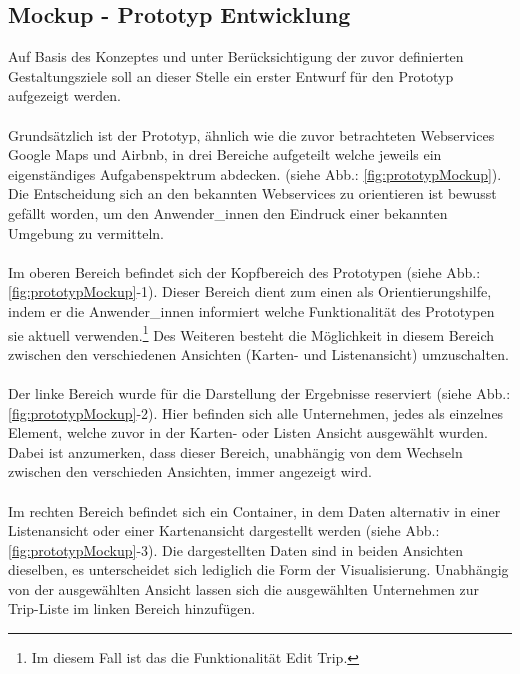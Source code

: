 \documentclass[Bachelorarbeit.tex]{subfiles}
\begin{document}
\subsection{Mockup - Prototyp Entwicklung}
\label{chap:entwicklung:sec:design_entwurf:sub:mockUps}
Auf Basis des Konzeptes und unter Berücksichtigung der zuvor definierten Gestaltungsziele soll an dieser Stelle ein erster Entwurf für den Prototyp aufgezeigt werden.\\
\\
Grundsätzlich ist der Prototyp, ähnlich wie die zuvor betrachteten Webservices Google Maps und Airbnb, in drei Bereiche aufgeteilt welche jeweils ein eigenständiges Aufgabenspektrum abdecken. (siehe Abb.: \ref{fig:prototypMockup}). 
Die Entscheidung sich an den bekannten Webservices zu orientieren ist bewusst gefällt worden, um den Anwender\_innen den Eindruck einer bekannten Umgebung zu vermitteln.\\
\\
Im oberen Bereich befindet sich der Kopfbereich des Prototypen (siehe Abb.: \ref{fig:prototypMockup}-1). 
Dieser Bereich dient zum einen als Orientierungshilfe, indem er die Anwender\_innen informiert welche Funktionalität des Prototypen sie aktuell verwenden.\footnote{Im diesem Fall ist das die Funktionalität Edit Trip.}
Des Weiteren besteht die Möglichkeit in diesem Bereich zwischen den verschiedenen Ansichten (Karten- und Listenansicht) umzuschalten.\\
\\
Der linke Bereich wurde für die Darstellung der Ergebnisse reserviert (siehe Abb.: \ref{fig:prototypMockup}-2). 
Hier befinden sich alle Unternehmen, jedes als einzelnes Element, welche zuvor in der Karten- oder Listen Ansicht ausgewählt wurden.
Dabei ist anzumerken, dass dieser Bereich, unabhängig von dem Wechseln zwischen den verschieden Ansichten, immer angezeigt wird. \\
\\
Im rechten Bereich befindet sich ein Container, in dem Daten alternativ in einer Listenansicht oder einer Kartenansicht dargestellt werden (siehe Abb.: \ref{fig:prototypMockup}-3). 
Die dargestellten Daten sind in beiden Ansichten dieselben, es unterscheidet sich lediglich die Form der Visualisierung.
Unabhängig von der ausgewählten Ansicht lassen sich die ausgewählten Unternehmen zur Trip-Liste im linken Bereich hinzufügen.
\end{document}
